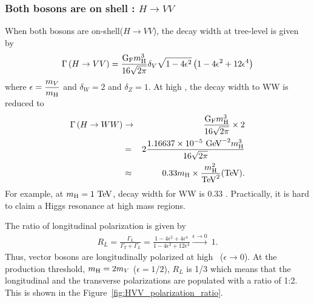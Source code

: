 %
\subsubsection{Both bosons are on shell : $H \rightarrow VV$}
When both bosons are on-shell($ H \rightarrow VV$), 
the decay width at tree-level is given by~\cite{PhysRevD.49.79}
\begin{eqnarray} 
\Gamma \left( H \rightarrow VV \right) 
= 
\frac{\mathrm{G_{\mathrm{F}}} m_{\mathrm{H}}^3}{16\sqrt{2\pi}} \delta_V \sqrt{1-4\epsilon^2} 
\left( 1 - 4\epsilon^2 + 12\epsilon^4 \right)
\end{eqnarray} 
where $\displaystyle \epsilon = \frac{m_V}{m_{\mathrm{H}}}$ and $\delta_W=2$ and $\delta_Z=1$.
At high \mHi, the decay width to WW is reduced to 
\begin{eqnarray} 
\Gamma \left( H \rightarrow WW \right)
&\rightarrow&
\frac{\mathrm{G_{\mathrm{F}}} m_{\mathrm{H}}^3}{16\sqrt{2\pi}} \times 2 \\
&=&  
2 \frac{ 1.16637 \times 10^{-5}~\mathrm{Ge\kern -0.1em V}^{-2} m_{\mathrm{H}}^3}{16\sqrt{2\pi}} \\
&\approx&
0.33 m_{\mathrm{H}} \times \frac{m_{\mathrm{H}}^2}{\mathrm{Te\kern -0.1em V}^2} (\mathrm{Te\kern -0.1em V}).   
\end{eqnarray} 
For example, at $m_{\mathrm{H}}=1~\mathrm{Te\kern -0.1em V}$, decay width for WW is 0.33 \TeV.
Practically, it is hard to claim a Higgs resonance at high mass regions.  

The ratio of longitudinal polarization is given by \cite{PhysRevD.49.79}
\begin{eqnarray} 
R_L 
= 
\frac{\Gamma_L}{\Gamma_T + \Gamma_L}    
= 
\frac{1 - 4\epsilon^2 + 4\epsilon^4}{1 - 4\epsilon^2 + 12\epsilon^4} 
\xrightarrow{\epsilon \rightarrow 0}\ 1.
\end{eqnarray} 
Thus, vector bosons are longitudinally polarized at high \mHi\ ($\epsilon \rightarrow 0$). 
At the production threshold, $\displaystyle m_{\mathrm{H}} = 2m_V$ ($\epsilon = 1/2$), 
$R_L$ is 1/3 which means that the longitudinal and the transverse polarizations are populated 
with a ratio of 1:2. This is shown in the Figure~\ref{fig:HVV_polarization_ratio}.

%
